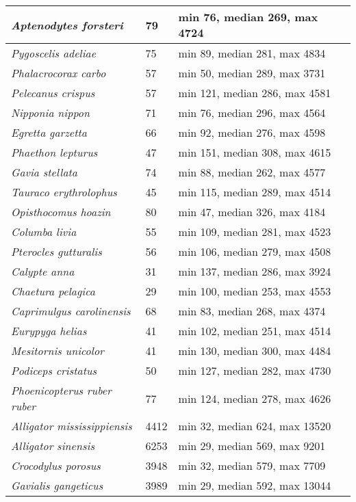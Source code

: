 {\begin{longtable}{| L{4cm} | L{2cm}  | L{5cm} | L{4cm} |}
\textit{Aptenodytes forsteri} & 79 & min 76, median 269, max 4724 & \\ \hline
\textit{Pygoscelis adeliae} & 75 & min 89, median 281, max 4834 & \\ \hline
\textit{Phalacrocorax carbo} & 57 & min 50, median 289, max 3731 & \\ \hline
\textit{Pelecanus crispus} & 57 & min 121, median 286, max 4581 & \\ \hline
\textit{Nipponia nippon} & 71 & min 76, median 296, max 4564 & \\ \hline
\textit{Egretta garzetta} & 66 & min 92, median 276, max 4598 & \\ \hline
\textit{Phaethon lepturus} & 47 & min 151, median 308, max 4615 & \\ \hline
\textit{Gavia stellata} & 74 & min 88, median 262, max 4577 & \\ \hline
\textit{Tauraco erythrolophus} & 45 & min 115, median 289, max 4514 & \\ \hline
\textit{Opisthocomus hoazin} & 80 & min 47, median 326, max 4184 & \\ \hline
\textit{Columba livia} & 55 & min 109, median 281, max 4523 & \\ \hline
\textit{Pterocles gutturalis} & 56 & min 106, median 279, max 4508 & \\ \hline
\textit{Calypte anna} & 31 & min 137, median 286, max 3924 & \\ \hline
\textit{Chaetura pelagica} & 29 & min 100, median 253, max 4553 & \\ \hline
\textit{Caprimulgus carolinensis} & 68 & min 83, median 268, max 4374 & \\ \hline
\textit{Eurypyga helias} & 41 & min 102, median 251, max 4514 & \\ \hline
\textit{Mesitornis unicolor} & 41 & min 130, median 300, max 4484 & \\ \hline
\textit{Podiceps cristatus} & 50 & min 127, median 282, max 4730 & \\ \hline
\textit{Phoenicopterus ruber ruber} & 77 & min 124, median 278, max 4626 & \\ \hline
\textit{Alligator mississippiensis} & 4412 & min 32, median 624, max 13520 & \\ \hline
\textit{Alligator sinensis} & 6253 & min 29, median 569, max 9201 & \\ \hline
\textit{Crocodylus porosus} & 3948 & min 32, median 579, max 7709 & \\ \hline
\textit{Gavialis gangeticus} & 3989 & min 29, median 592, max 13044 & \\ \hline

\end{longtable}}
